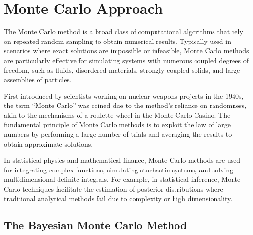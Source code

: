 \section{Monte Carlo Approach}\label{sec:Monte_Carlo}
The Monte Carlo method is a broad class of computational algorithms that rely on repeated random sampling to obtain numerical results. Typically used in scenarios where exact solutions are impossible or infeasible, Monte Carlo methods are particularly effective for simulating systems with numerous coupled degrees of freedom, such as fluids, disordered materials, strongly coupled solids, and large assemblies of particles.

First introduced by scientists working on nuclear weapons projects in the 1940s, the term ``Monte Carlo'' was coined due to the method's reliance on randomness, akin to the mechanisms of a roulette wheel in the Monte Carlo Casino. The fundamental principle of Monte Carlo methods is to exploit the law of large numbers by performing a large number of trials and averaging the results to obtain approximate solutions.

In statistical physics and mathematical finance, Monte Carlo methods are used for integrating complex functions, simulating stochastic systems, and solving multidimensional definite integrals. For example, in statistical inference, Monte Carlo techniques facilitate the estimation of posterior distributions where traditional analytical methods fail due to complexity or high dimensionality.

\subsection{The Bayesian Monte Carlo Method}



